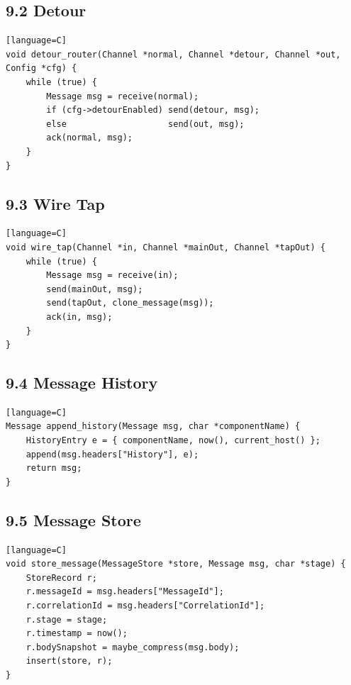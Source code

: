\documentclass[11pt]{article}
\begin{document}
\subsection{9.2 Detour}\label{detour}

\begin{verbatim}[language=C]
void detour_router(Channel *normal, Channel *detour, Channel *out, Config *cfg) {
    while (true) {
        Message msg = receive(normal);
        if (cfg->detourEnabled) send(detour, msg);
        else                    send(out, msg);
        ack(normal, msg);
    }
}
\end{verbatim}

\subsection{9.3 Wire Tap}\label{wire-tap}

\begin{verbatim}[language=C]
void wire_tap(Channel *in, Channel *mainOut, Channel *tapOut) {
    while (true) {
        Message msg = receive(in);
        send(mainOut, msg);
        send(tapOut, clone_message(msg));
        ack(in, msg);
    }
}
\end{verbatim}

\subsection{9.4 Message History}\label{message-history}

\begin{verbatim}[language=C]
Message append_history(Message msg, char *componentName) {
    HistoryEntry e = { componentName, now(), current_host() };
    append(msg.headers["History"], e);
    return msg;
}
\end{verbatim}

\subsection{9.5 Message Store}\label{message-store}

\begin{verbatim}[language=C]
void store_message(MessageStore *store, Message msg, char *stage) {
    StoreRecord r;
    r.messageId = msg.headers["MessageId"];
    r.correlationId = msg.headers["CorrelationId"];
    r.stage = stage;
    r.timestamp = now();
    r.bodySnapshot = maybe_compress(msg.body);
    insert(store, r);
}
\end{verbatim}
\end{document}
